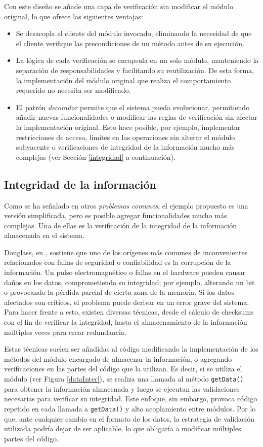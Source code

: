 Con este diseño se añade una capa de verificación sin modificar el módulo original, lo que ofrece las siguientes ventajas:
\begin{itemize}
\item Se desacopla el cliente del módulo invocado, eliminando la necesidad de que el cliente verifique las precondiciones de un método antes de su ejecución.
\item La lógica de cada verificación se encapsula en un solo módulo, manteniendo la separación de responsabilidades y facilitando su reutilización. De esta forma, la implementación del módulo original que realiza el comportamiento requerido no necesita ser modificado.
\item El patrón \textit{decorador} permite que el sistema pueda evolucionar, permitiendo añadir nuevas funcionalidades o modificar las reglas de verificación sin afectar la implementación original. Esto hace posible, por ejemplo, implementar restricciones de acceso, límites en las operaciones sin alterar el módulo subyacente o verificaciones de integridad de la información mucho más complejas (ver Sección \ref{integridad} a continuación).
\end{itemize}

\subsection*{Integridad de la información}
\label{integridad}

Como se ha señalado en otros \textit{problemas comunes}, el ejemplo propuesto es una versión simplificada, pero es posible agregar funcionalidades mucho más complejas. Una de ellas es la verificación de la integridad de la información almacenada en el sistema.

Douglass, en \cite{douglass}, sostiene que uno de los orígenes más comunes de inconvenientes relacionados con fallas de seguridad o confiabilidad es la corrupción de la información. Un pulso electromagnético o fallas en el hardware pueden causar daños en los datos, comprometiendo su integridad; por ejemplo, alterando un \gls{bit} o provocando la pérdida parcial de cierta zona de la memoria. Si los datos afectados son críticos, el problema puede derivar en un error grave del sistema. Para hacer frente a esto, existen diversas técnicas, desde el cálculo de checksums con el fin de verificar la integridad, hasta el almacenamiento de la información múltiples veces para crear redundancia.

Estas técnicas suelen ser añadidas al código modificando la implementación de los métodos del módulo encargado de almacenar la información, o agregando verificaciones en las partes del código que la utilizan. Es decir, si se utiliza el módulo \Data (ver Figura \ref{dataInter}), se realiza una llamada al método \verb|getData()| para obtener la información almacenada y luego se ejecutan las validaciones necesarias para verificar su integridad. Este enfoque, sin embargo, provoca código repetido en cada llamada a \verb|getData()| y alto acoplamiento entre módulos. Por lo que, ante cualquier cambio en el formato de los datos, la estrategia de validación utilizada podría dejar de ser aplicable, lo que obligaría a modificar múltiples partes del código.

